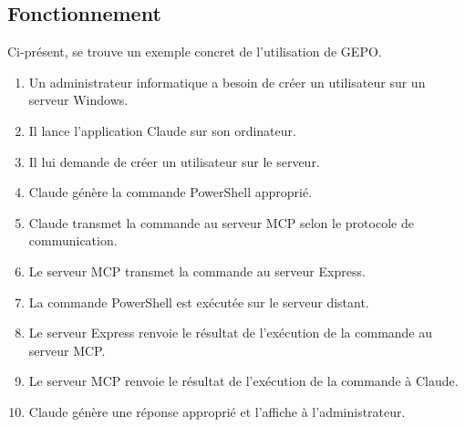\subsection*{Fonctionnement}
Ci-présent, se trouve un exemple concret de l'utilisation de GEPO. 

\begin{enumerate}
    \item Un administrateur informatique a besoin de créer un utilisateur sur un serveur Windows.
    \item Il lance l'application Claude sur son ordinateur.
    \item Il lui demande de créer un utilisateur sur le serveur.
    \item Claude génère la commande PowerShell approprié.
    \item Claude transmet la commande au serveur MCP selon le protocole de communication.
    \item Le serveur MCP transmet la commande au serveur Express.
    \item La commande PowerShell est exécutée sur le serveur distant.
    \item Le serveur Express renvoie le résultat de l’exécution de la commande au serveur MCP.
    \item Le serveur MCP renvoie le résultat de l’exécution de la commande à Claude.
    \item Claude génère une réponse approprié et l'affiche à l'administrateur.
\end{enumerate}
